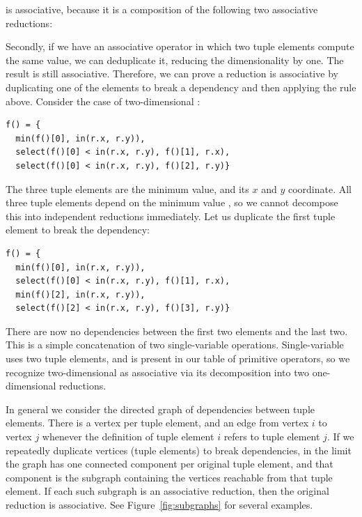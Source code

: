 
is associative, because it is a composition of the following two associative reductions:



Secondly, if we have an associative operator in which two tuple elements compute the same value, we can deduplicate it, reducing the dimensionality by one. The result is still associative. Therefore, we can prove a reduction is associative by duplicating one of the elements to break a dependency and then applying the rule above. Consider the case of two-dimensional :

\begin{lstlisting}
f() = {
  min(f()[0], in(r.x, r.y)),
  select(f()[0] < in(r.x, r.y), f()[1], r.x),
  select(f()[0] < in(r.x, r.y), f()[2], r.y)}
\end{lstlisting}

The three tuple elements are the minimum value, and its $x$ and $y$ coordinate. All three tuple elements depend on the minimum value , so we cannot decompose this into independent reductions immediately. Let us duplicate the first tuple element to break the dependency:

\begin{lstlisting}
f() = {
  min(f()[0], in(r.x, r.y)),
  select(f()[0] < in(r.x, r.y), f()[1], r.x),
  min(f()[2], in(r.x, r.y)),
  select(f()[2] < in(r.x, r.y), f()[3], r.y)}
\end{lstlisting}

There are now no dependencies between the first two elements and the last two. This is a simple concatenation of two single-variable  operations. Single-variable  uses two tuple elements, and is present in our table of primitive operators, so we recognize two-dimensional  as associative via its decomposition into two one-dimensional  reductions.

In general we consider the directed graph of dependencies between tuple elements. There is a vertex per tuple element, and an edge from vertex $i$ to vertex $j$ whenever the definition of tuple element $i$ refers to tuple element $j$. If we repeatedly duplicate vertices (tuple elements) to break dependencies, in the limit the graph has one connected component per original tuple element, and that component is the subgraph containing the vertices reachable from that tuple element. If each such subgraph is an associative reduction, then the original reduction is associative. See Figure~\ref{fig:subgraphs} for several examples.

